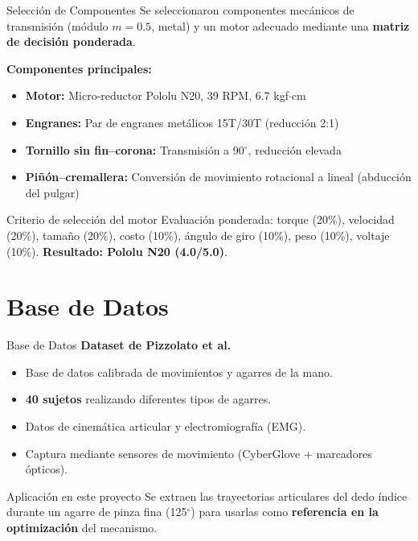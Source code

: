 \documentclass[xcolor={table,dvipsnames}]{beamer}
\begin{document}
\begin{frame}{Selecci\'on de Componentes}
    \small
    Se seleccionaron componentes mec\'anicos de transmisi\'on (m\'odulo $m=0.5$, metal) y un motor adecuado mediante una \textbf{matriz de decisi\'on ponderada}.

    \vspace{0.3cm}
    \textbf{Componentes principales:}
    \begin{itemize}
        \item \textbf{Motor:} Micro-reductor Pololu N20, 39 RPM, 6.7 kgf$\cdot$cm \cite{pololu_5202}
        \item \textbf{Engranes:} Par de engranes met\'alicos 15T/30T (reducci\'on 2:1)
        \item \textbf{Tornillo sin fin--corona:} Transmisi\'on a 90$^\circ$, reducci\'on elevada
        \item \textbf{Pi\~n\'on--cremallera:} Conversi\'on de movimiento rotacional a lineal (abducci\'on del pulgar)
    \end{itemize}

    \vspace{0.2cm}
    \begin{block}{Criterio de selecci\'on del motor}
        Evaluaci\'on ponderada: torque (20\%), velocidad (20\%), tama\~no (20\%), costo (10\%), \'angulo de giro (10\%), peso (10\%), voltaje (10\%). \textbf{Resultado: Pololu N20 (4.0/5.0)}.
    \end{block}
\end{frame}

\section{Base de Datos}

\begin{frame}{Base de Datos}
    \small
    \textbf{Dataset de Pizzolato et al.} \cite{Pizzolato2017}
    \begin{itemize}
        \item Base de datos calibrada de movimientos y agarres de la mano.
        \item \textbf{40 sujetos} realizando diferentes tipos de agarres.
        \item Datos de cinem\'atica articular y electromiograf\'ia (EMG).
        \item Captura mediante sensores de movimiento (CyberGlove + marcadores \'opticos).
    \end{itemize}

    \vspace{0.3cm}
    \begin{block}{Aplicaci\'on en este proyecto}
        Se extraen las trayectorias articulares del dedo \'indice durante un agarre de pinza fina (125$^\circ$) para usarlas como \textbf{referencia en la optimizaci\'on} del mecanismo.
    \end{block}
\end{frame}
\end{document}
